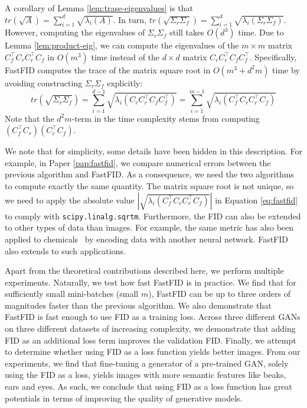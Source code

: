 \documentclass[11pt,a4paper,twoside,openright,final]{memoir}
\newcommand*{\paperref}[1]{Paper \hyperref[#1]{\ref{#1}}}
\begin{document}
A corollary of Lemma \ref{lem:trase-eigenvalues} is that $tr(\sqrt{A}) = \sum_{i=1}^d \sqrt{\lambda_i(A)}$.
In turn, $tr(\sqrt{\Sigma_r\Sigma_f}) = \sum_{i=1}^d \sqrt{\lambda_i(\Sigma_r\Sigma_f) }$.
However, computing the eigenvalues of $\Sigma_r\Sigma_f$ still takes $O(d^3)$ time.
Due to Lemma \ref{lem:product-eig}, we can compute the eigenvalues of the $m\times m$ matrix $C_f^\intercal C_rC_r^\intercal C_f$ in $O(m^3)$ time instead of the $d\times d$ matrix $C_rC_r^\intercal C_fC_f^\intercal$.
Specifically, FastFID computes the trace of the matrix square root in $O(m^3 + d^2m)$ time by avoiding constructing $\Sigma_r\Sigma_f$ explicitly:
\begin{equation}\label{eq:fastfid}
   tr( \sqrt{\Sigma_r\Sigma_f}) = \sum_{i=1}^{d-1}\sqrt{\lambda_i(C_rC_r^\intercal C_fC_f^\intercal)} = \sum_{i=1}^{m-1} \sqrt{\lambda_i(C_f^\intercal C_rC_r^\intercal C_f)}
\end{equation}
Note that the $d^2m$-term in the time complexity stems from computing $(C_f^\intercal C_r)(C_r^\intercal C_f)$.

We note that for simplicity, some details have been hidden in this description.
For example, in \paperref{pap:fastfid}, we compare numerical errors between the previous algorithm and FastFID.
As a consequence, we need the two algorithms to compute exactly the same quantity.
The matrix square root is not unique, so we need to apply the absolute value $|\sqrt{\lambda_i(C_f^\intercal C_rC_r^\intercal C_f)}|$ in Equation \eqref{eq:fastfid} to comply with \verb^scipy.linalg.sqrtm^.
Furthermore, the FID can also be extended to other types of data than images.
For example, the same metric has also been applied to chemicals~\cite{fcd} by encoding data with another neural network.
FastFID also extends to such applications.

Apart from the theoretical contributions described here, we perform multiple experiments.
Naturally, we test how fast FastFID is in practice.
We find that for sufficiently small mini-batches (small $m$), FastFID can be up to three orders of magnitudes faster than the previous algorithm.
We also demonstrate that FastFID is fast enough to use FID as a training loss.
Across three different GANs on three different datasets of increasing complexity, we demonstrate that adding FID as an additional loss term improves the validation FID.
Finally, we attempt to determine whether using FID as a loss function yields better images.
From our experiments, we find that fine-tuning a generator of a pre-trained GAN, solely using the FID as a loss, yields images with more semantic features like beaks, ears and eyes.
As such, we conclude that using FID as a loss function has great potentials in terms of improving the quality of generative models.
 
\end{document}
